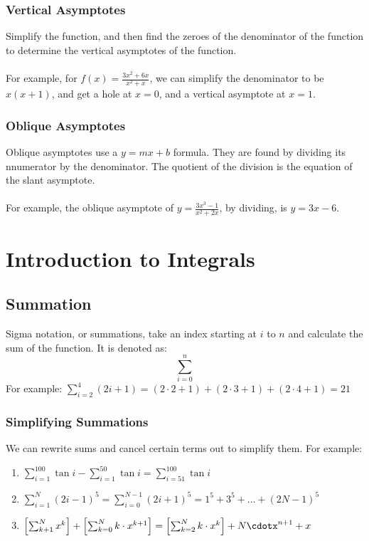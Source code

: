\documentclass{article}
\begin{document}
\subsubsection{Vertical Asymptotes}
Simplify the function, and then find the zeroes of the denominator of the function to determine the vertical asymptotes of the function.\\
\\
For example, for $f(x) = \frac{3x^2 + 6x}{x^2 + x}$, we can simplify the denominator to be $x(x + 1)$, and get a hole at $x = 0$, and a vertical asymptote at $x = 1$.

\subsubsection{Oblique Asymptotes}
Oblique asymptotes use a $y = mx + b$ formula. They are found by dividing its nnumerator by the denominator. The quotient of the division is the equation of the slant asymptote.\\
\\
For example, the oblique asymptote of $y = \frac{3x^3 - 1}{x^2 + 2x}$, by dividing, is $ y = 3x - 6$.

\section{Introduction to Integrals}
\subsection{Summation}
Sigma notation, or summations, take an index starting at $i$ to $n$ and calculate the sum of the function. It is denoted as: $$\sum_{i=0}^{n}$$
For example: $\sum_{i=2}^{4}(2i + 1) = (2\cdot 2 + 1) + (2\cdot3 + 1) + (2\cdot 4 + 1) = 21$\\

\subsubsection{Simplifying Summations}
We can rewrite sums and cancel certain terms out to simplify them. For example:
\begin{enumerate}
    \item $\sum_{i=1}^{100}\tan i - \sum_{i=1}^{50}\tan i = \sum_{i = 51}^{100} \tan i$
    \item $\sum_{i=1}^{N}(2i-1)^5 = \sum_{i=0}^{N-1} (2i+1)^5 = 1^5 + 3^5 + ... + (2N - 1)^5$
    \item $\left[ \sum_{k+1}^{N}x^k \right] + \left[ \sum_{k=0}^{N} k \cdot x^{k+1}\right] = \left[ \sum_{k=2}^{N} k \cdot x^k \right] + N\cdotx^{n + 1} + x$
\end{enumerate}
\end{document}
